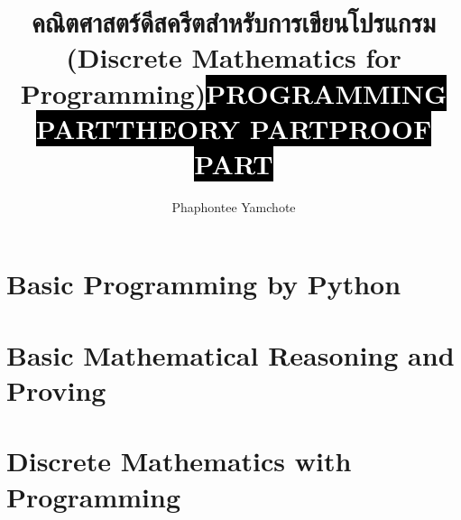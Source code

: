 \documentclass[12pt,twoside,openright]{book}
\title{คณิตศาสตร์ดีสครีตสำหรับการเขียนโปรแกรม\\(Discrete Mathematics for Programming)}
\author{Phaphontee Yamchote}
\date{}
\title{\sffamily\colorbox{black}{\bfseries\textcolor{white}{\Large PROGRAMMING PART}}}
\title{\sffamily\colorbox{black}{\bfseries\textcolor{white}{\Large THEORY PART}}}
\title{\sffamily\colorbox{black}{\bfseries\textcolor{white}{\Large PROOF PART}}}
\theoremstyle{definition}
\begin{document}
	\maketitle
	\frontmatter
	\tableofcontents

	\mainmatter

    \part{Basic Programming by Python}
    
    
%    
   	\part{Basic Mathematical Reasoning and Proving}
   	
   	
   	
   	
%   	
%   	
   	\part{Discrete Mathematics with Programming}
   	
   	
   	
   	
   	
   	
   	
   	
%   	
	
	
	\backmatter
%	
	\printindex
\end{document}
